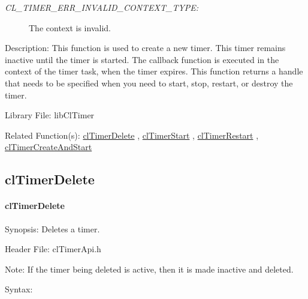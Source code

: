 \begin{flushleft}
\begin{Desc}
\begin{description}
\item[{\em CL\_\-TIMER\_\-ERR\_\-INVALID\_\-CONTEXT\_\-TYPE:}]The context is invalid.\end{description}
\end{Desc}
\begin{Desc}
\item[Description:]This function is used to create a new timer. This timer remains inactive until the timer is started. The callback function is 
executed in the context of the timer task, when the timer expires. This function returns a handle that needs to be specified when you need
to start, stop, restart, or destroy the timer.\end{Desc}
\begin{Desc}
\item[Library File:]lib\-Cl\-Timer\end{Desc}
\begin{Desc}
\item[Related Function(s):]\hyperlink{pagetmr105}{cl\-Timer\-Delete} , \hyperlink{pagetmr106}{cl\-Timer\-Start} , 
\hyperlink{pagetmr109}{cl\-Timer\-Restart} , \hyperlink{pagetmr108}{cl\-Timer\-Create\-And\-Start} \end{Desc}


\newpage

\subsection{clTimerDelete}
\hypertarget{pagetmr105}{}\paragraph{cl\-Timer\-Delete}\label{pagetmr105}
\begin{Desc}
\item[Synopsis:]Deletes a timer.\end{Desc}
\begin{Desc}
\item[Header File:]clTimerApi.h\end{Desc}
\begin{Desc}
\item[Note:]If the timer being deleted is active, then it is made inactive and deleted.\end{Desc}
\begin{Desc}
\item[Syntax:]


\end{Desc}
\end{flushleft}
